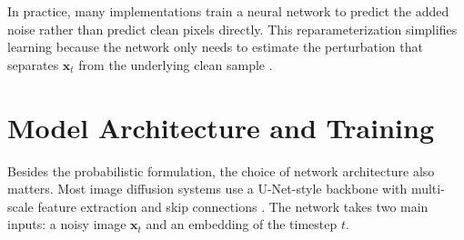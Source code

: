 \documentclass[a4paper,12pt]{article}
\newcommand{\vect}[1]{\bm{#1}}
\begin{document}
In practice, many implementations train a neural network to predict the added noise rather than predict clean pixels directly. This reparameterization simplifies learning because the network only needs to estimate the perturbation that separates $\vect{x}_t$ from the underlying clean sample \cite{ho2020ddpm,nichol2021improved}.

\section{Model Architecture and Training}
Besides the probabilistic formulation, the choice of network architecture also matters. Most image diffusion systems use a U-Net-style backbone with multi-scale feature extraction and skip connections \cite{ronneberger2015unet}. The network takes two main inputs: a noisy image $\vect{x}_t$ and an embedding of the timestep $t$.
\end{document}
